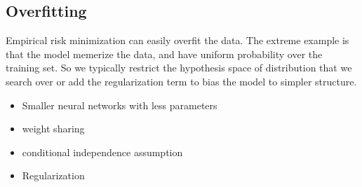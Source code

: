 \subsection{Overfitting} 
Empirical risk minimization can easily overfit the data. The extreme example is that the model memerize the data, and have uniform probability over the training set. So we typically restrict the hypothesis space of distribution  that we search over or add the regularization term to bias the model to simpler structure. 
    \begin{itemize}
        \item Smaller neural networks with less parameters 
        \item weight sharing 
        \item conditional independence assumption 
        \item Regularization 
    \end{itemize}